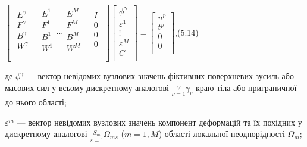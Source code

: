 $\begin{bmatrix}
\begin{matrix}
E^{\gamma} \\
F^{\gamma} \\
B^{\gamma} \\
W^{\gamma} \\
\end{matrix} & {\begin{matrix}
E^{1} \\
F^{1} \\
B^{1} \\
W^{1} \\
\end{matrix}\text{.}\text{.}\text{.}\begin{matrix}
E^{M} \\
F^{M} \\
B^{M} \\
W^{M} \\
\end{matrix}} & \begin{matrix}
I \\
0 \\
0 \\
0 \\
\end{matrix} \\
\end{bmatrix}{\begin{bmatrix}
\phi^{\gamma} \\
\varepsilon^{1} \\
 \vdots \\
\varepsilon^{M} \\
C \\
\end{bmatrix} = \begin{bmatrix}
u^{p} \\
t^{p} \\
0 \\
0 \\
\end{bmatrix}}$,(5.14)

\noindent де $\phi^\gamma$ --- вектор невідомих вузлових значень фіктивних поверхневих зусиль або масових сил у всьому
дискретному аналогові $\underset{\nu = 1}{\overset{V}{}}\gamma_{v}$ краю тіла або приграничної до нього області;

$\varepsilon^m$ --- вектор невідомих вузлових значень компонент деформацій та їх похідних у дискретному аналогові
$\underset{s = 1}{\overset{S_{m}}{}}\Omega_{\mathit{\text{ms}}}$ ($m = \overline{1,M}$) області локальної неоднорідності
$\Omega_m$;

